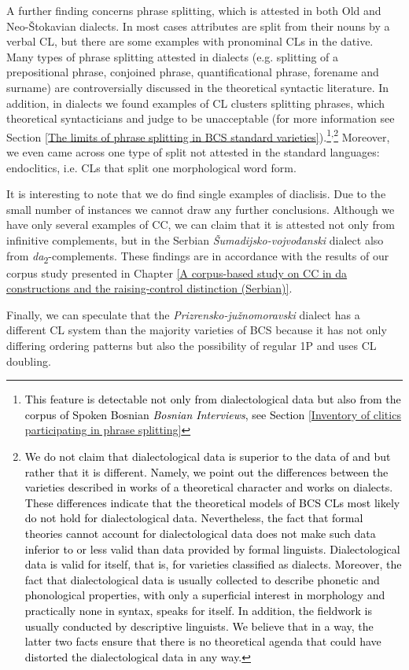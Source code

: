 A further finding concerns phrase splitting, which is attested in both Old and Neo-Štokavian dialects. In most cases attributes are split from their nouns by a verbal CL, but there are some examples with pronominal CLs in the dative. Many types of phrase splitting attested in dialects (e.g. splitting of a prepositional phrase, conjoined phrase, quantificational phrase, forename and surname) are controversially discussed in the theoretical syntactic literature. In addition, in dialects we found examples of CL clusters splitting phrases, which theoretical syntacticians \citet{Progovac96} and \citet{RadanovicKocic96} judge to be unacceptable (for more information see Section \ref{The limits of phrase splitting in BCS standard varieties}).\footnote{\textcolor{black}{This feature is detectable not only from dialectological data but also from the corpus of Spoken Bosnian \textit{Bosnian Interviews}, see Section \ref{Inventory of clitics participating in phrase splitting}}}\textsuperscript{,}\footnote{\textcolor{black}{We do not claim that dialectological data is superior to the data of \citet{Progovac96} and \citet{RadanovicKocic96} but rather that it is different. Namely, we point out the differences between the varieties described in works of a theoretical character and works on dialects. These differences indicate that the theoretical models of BCS CLs most likely do not hold for dialectological data. Nevertheless, the fact that formal theories cannot account for dialectological data does not make such data inferior to or less valid than data provided by formal linguists. Dialectological data is valid for itself, that is, for varieties classified as dialects. Moreover, the fact that dialectological data is usually collected to describe phonetic and phonological properties, with only a superficial interest in morphology and practically none in syntax, speaks for itself. In addition, the fieldwork is usually conducted by descriptive linguists. We believe that in a way, the latter two facts ensure that there is no theoretical agenda that could have distorted the dialectological data in any way.}} Moreover, we even came across one type of split not attested in the standard languages: endoclitics, i.e. CLs that split one morphological word form.

It is interesting to note that we do find single examples of diaclisis. Due to the small number of instances we cannot draw any further conclusions. Although we have only several examples of CC, we can claim that it is attested not only from infinitive complements, but in the Serbian \textit{Šumadijsko-vojvođanski} dialect also from \textit{da}\textsubscript{2}-complements. These findings are in accordance with the results of our corpus study presented in Chapter \ref{A corpus-based study on CC in da constructions and the raising-control distinction (Serbian)}.

Finally, we can speculate that the \textit{Prizrensko-južnomoravski} dialect has a different CL system than the majority varieties of BCS because it has not only differing ordering patterns but also the possibility of regular 1P and uses CL doubling.
